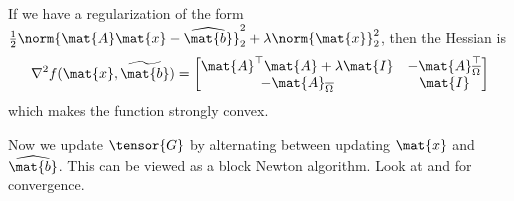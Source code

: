 If we have a regularization of the form $\frac{1}{2}\norm{\mat{A} \mat{x} - \widehat{\mat{b}}}_2^2 + \lambda\norm{\mat{x}}_2^2$,
then the Hessian is
\[
\nabla^2 f(\mat{x},\widetilde{\mat{b}}) =
\begin{bmatrix}
\mat{A}^\top \mat{A} + \lambda \mat{I} & -\mat{A}_{\overline{\Omega}}^\top \\
-\mat{A}_{\overline{\Omega}} & \mat{I}
\end{bmatrix}
\]
which makes the function strongly convex.
\fi

\iffalse
Now we update $\tensor{G}$ by alternating between updating $\mat{x}$ and $\widehat{\mat{b}}$. This can be viewed as a block Newton algorithm.  Look at \cite{warga1963minimizing} and \cite{tseng2001convergence} for convergence. 


